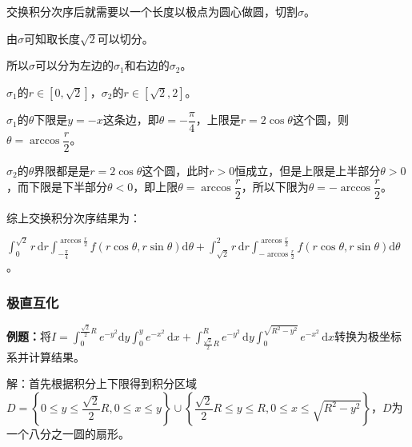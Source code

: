 \documentclass[UTF8, 12pt]{ctexart}
\begin{document}
\begin{minipage}{0.625\linewidth}
    
    交换积分次序后就需要以一个长度以极点为圆心做圆，切割$\sigma$。

    由$\sigma$可知取长度$\sqrt{2}$可以切分。

    所以$\sigma$可以分为左边的$\sigma_1$和右边的$\sigma_2$。
\end{minipage}
\hfill
\begin{minipage}{0.25\linewidth}
\end{minipage}

$\sigma_1$的$r\in[0,\sqrt{2}]$，$\sigma_2$的$r\in[\sqrt{2},2]$。

$\sigma_1$的$\theta$下限是$y=-x$这条边，即$\theta=-\dfrac{\pi}{4}$，上限是$r=2\cos\theta$这个圆，则$\theta=\arccos\dfrac{r}{2}$。

$\sigma_2$的$\theta$界限都是是$r=2\cos\theta$这个圆，此时$r>0$恒成立，但是上限是上半部分$\theta>0$，而下限是下半部分$\theta<0$，即上限$\theta=\arccos\dfrac{r}{2}$，所以下限为$\theta=-\arccos\dfrac{r}{2}$。

综上交换积分次序结果为：

$\int_0^{\sqrt{2}}r\,\textrm{d}r\int_{-\frac{\pi}{4}}^{\arccos\frac{r}{2}}f(r\cos\theta,r\sin\theta)\textrm{d}\theta+\int_{\sqrt{2}}^2r\,\textrm{d}r\int_{-\arccos\frac{r}{2}}^{\arccos\frac{r}{2}}f(r\cos\theta,r\sin\theta)\textrm{d}\theta$。

\subsubsection{极直互化}

\textbf{例题：}将$I=\int_0^{\frac{\sqrt{2}}{2}R}e^{-y^2}\textrm{d}y\int_0^ye^{-x^2}\,\textrm{d}x+\int_{\frac{\sqrt{2}}{2}R}^Re^{-y^2}\,\textrm{d}y\int_0^{\sqrt{R^2-y^2}}e^{-x^2}\,\textrm{d}x$转换为极坐标系并计算结果。

解：首先根据积分上下限得到积分区域$D=\left\{0\leqslant y\leqslant\dfrac{\sqrt{2}}{2}R,0\leqslant x\leqslant y\right\}\cup\left\{\dfrac{\sqrt{2}}{2}R\leqslant y\leqslant R,0\leqslant x\leqslant\sqrt{R^2-y^2}\right\}$，$D$为一个八分之一圆的扇形。
\end{document}
